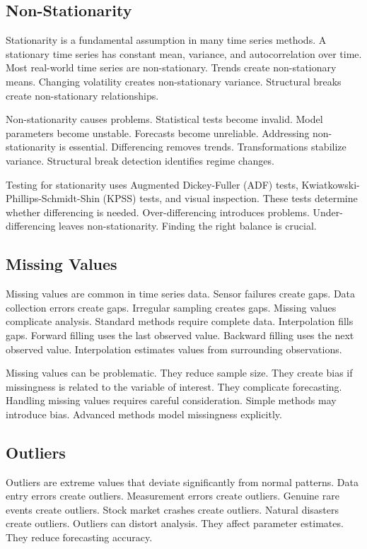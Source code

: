 \subsection{Non-Stationarity}

Stationarity is a fundamental assumption in many time series methods. A stationary time series has constant mean, variance, and autocorrelation over time. Most real-world time series are non-stationary. Trends create non-stationary means. Changing volatility creates non-stationary variance. Structural breaks create non-stationary relationships.

Non-stationarity causes problems. Statistical tests become invalid. Model parameters become unstable. Forecasts become unreliable. Addressing non-stationarity is essential. Differencing removes trends. Transformations stabilize variance. Structural break detection identifies regime changes.

Testing for stationarity uses Augmented Dickey-Fuller (ADF) tests, Kwiatkowski-Phillips-Schmidt-Shin (KPSS) tests, and visual inspection. These tests determine whether differencing is needed. Over-differencing introduces problems. Under-differencing leaves non-stationarity. Finding the right balance is crucial.

\subsection{Missing Values}

Missing values are common in time series data. Sensor failures create gaps. Data collection errors create gaps. Irregular sampling creates gaps. Missing values complicate analysis. Standard methods require complete data. Interpolation fills gaps. Forward filling uses the last observed value. Backward filling uses the next observed value. Interpolation estimates values from surrounding observations.

Missing values can be problematic. They reduce sample size. They create bias if missingness is related to the variable of interest. They complicate forecasting. Handling missing values requires careful consideration. Simple methods may introduce bias. Advanced methods model missingness explicitly.

\subsection{Outliers}

Outliers are extreme values that deviate significantly from normal patterns. Data entry errors create outliers. Measurement errors create outliers. Genuine rare events create outliers. Stock market crashes create outliers. Natural disasters create outliers. Outliers can distort analysis. They affect parameter estimates. They reduce forecasting accuracy.

